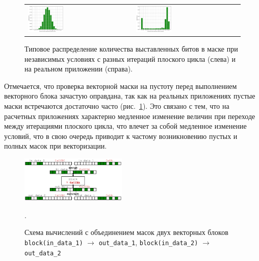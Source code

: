 \documentclass[a4paper,14pt]{extarticle}                     %
\theoremstyle{plain}                                         %
\begin{document}
\begin{figure}[!ht]
\centering
\begin{tabular}{ll}
\includegraphics[width=0.35\textwidth]{./pics/text_4_vec_comb_mask/independent_p.png}
&
\includegraphics[width=0.35\textwidth]{./pics/text_4_vec_comb_mask/real_p.png}
\end{tabular}
\singlespacing
\caption{Типовое распределение количества выставленных битов в маске при независимых условиях с разных итераций плоского цикла (слева) и на реальном приложении (справа).}
\label{fig:text_4_vec_comb_mask_independent_p}
\end{figure}

Отмечается, что проверка векторной маски на пустоту перед выполнением векторного блока зачастую оправдана, так как на реальных приложениях пустые маски встречаются достаточно часто (рис.~\ref{fig:text_4_vec_comb_mask_independent_p}).
Это связано с тем, что на расчетных приложениях характерно медленное изменение величин при переходе между итерациями плоского цикла, что влечет за собой медленное изменение условий, что в свою очередь приводит к частому возникновению пустых и полных масок при векторизации.


\begin{figure}[ht]
\centering
\includegraphics[width=0.45\textwidth]{./fig/vec_unite_masks.pdf}
\singlespacing
\caption{Схема вычислений с объединением масок двух векторных блоков \texttt{block(in\_data\_1)} $\rightarrow$ \texttt{out\_data\_1}, \texttt{block(in\_data\_2)} $\rightarrow$ \texttt{out\_data\_2}}.
\label{fig:vec_unite_masks}
\end{figure}
\end{document}
